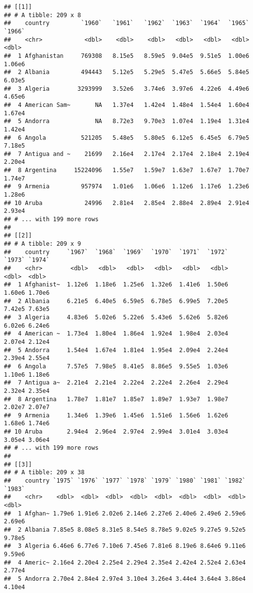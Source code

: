 \documentclass[]{article}
\begin{document}
\begin{verbatim}
## [[1]]
## # A tibble: 209 x 8
##    country         `1960`   `1961`   `1962`  `1963`  `1964`  `1965`  `1966`
##    <chr>            <dbl>    <dbl>    <dbl>   <dbl>   <dbl>   <dbl>   <dbl>
##  1 Afghanistan     769308   8.15e5   8.59e5  9.04e5  9.51e5  1.00e6  1.06e6
##  2 Albania         494443   5.12e5   5.29e5  5.47e5  5.66e5  5.84e5  6.03e5
##  3 Algeria        3293999   3.52e6   3.74e6  3.97e6  4.22e6  4.49e6  4.65e6
##  4 American Sam~       NA   1.37e4   1.42e4  1.48e4  1.54e4  1.60e4  1.67e4
##  5 Andorra             NA   8.72e3   9.70e3  1.07e4  1.19e4  1.31e4  1.42e4
##  6 Angola          521205   5.48e5   5.80e5  6.12e5  6.45e5  6.79e5  7.18e5
##  7 Antigua and ~    21699   2.16e4   2.17e4  2.17e4  2.18e4  2.19e4  2.20e4
##  8 Argentina     15224096   1.55e7   1.59e7  1.63e7  1.67e7  1.70e7  1.74e7
##  9 Armenia         957974   1.01e6   1.06e6  1.12e6  1.17e6  1.23e6  1.28e6
## 10 Aruba            24996   2.81e4   2.85e4  2.88e4  2.89e4  2.91e4  2.93e4
## # ... with 199 more rows
## 
## [[2]]
## # A tibble: 209 x 9
##    country     `1967`  `1968`  `1969`  `1970`  `1971`  `1972` `1973` `1974`
##    <chr>        <dbl>   <dbl>   <dbl>   <dbl>   <dbl>   <dbl>  <dbl>  <dbl>
##  1 Afghanist~  1.12e6  1.18e6  1.25e6  1.32e6  1.41e6  1.50e6 1.60e6 1.70e6
##  2 Albania     6.21e5  6.40e5  6.59e5  6.78e5  6.99e5  7.20e5 7.42e5 7.63e5
##  3 Algeria     4.83e6  5.02e6  5.22e6  5.43e6  5.62e6  5.82e6 6.02e6 6.24e6
##  4 American ~  1.73e4  1.80e4  1.86e4  1.92e4  1.98e4  2.03e4 2.07e4 2.12e4
##  5 Andorra     1.54e4  1.67e4  1.81e4  1.95e4  2.09e4  2.24e4 2.39e4 2.55e4
##  6 Angola      7.57e5  7.98e5  8.41e5  8.86e5  9.55e5  1.03e6 1.10e6 1.18e6
##  7 Antigua a~  2.21e4  2.21e4  2.22e4  2.22e4  2.26e4  2.29e4 2.32e4 2.35e4
##  8 Argentina   1.78e7  1.81e7  1.85e7  1.89e7  1.93e7  1.98e7 2.02e7 2.07e7
##  9 Armenia     1.34e6  1.39e6  1.45e6  1.51e6  1.56e6  1.62e6 1.68e6 1.74e6
## 10 Aruba       2.94e4  2.96e4  2.97e4  2.99e4  3.01e4  3.03e4 3.05e4 3.06e4
## # ... with 199 more rows
## 
## [[3]]
## # A tibble: 209 x 38
##    country `1975` `1976` `1977` `1978` `1979` `1980` `1981` `1982` `1983`
##    <chr>    <dbl>  <dbl>  <dbl>  <dbl>  <dbl>  <dbl>  <dbl>  <dbl>  <dbl>
##  1 Afghan~ 1.79e6 1.91e6 2.02e6 2.14e6 2.27e6 2.40e6 2.49e6 2.59e6 2.69e6
##  2 Albania 7.85e5 8.08e5 8.31e5 8.54e5 8.78e5 9.02e5 9.27e5 9.52e5 9.78e5
##  3 Algeria 6.46e6 6.77e6 7.10e6 7.45e6 7.81e6 8.19e6 8.64e6 9.11e6 9.59e6
##  4 Americ~ 2.16e4 2.20e4 2.25e4 2.29e4 2.35e4 2.42e4 2.52e4 2.63e4 2.77e4
##  5 Andorra 2.70e4 2.84e4 2.97e4 3.10e4 3.26e4 3.44e4 3.64e4 3.86e4 4.10e4

\end{verbatim}
\end{document}
